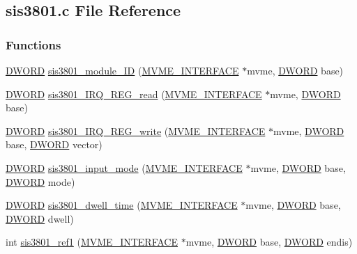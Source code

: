 \subsection{sis3801.c File Reference}
\label{sis3801_8c}
\subsubsection*{Functions}
\begin{DoxyCompactItemize}
\item 
\hyperlink{vt2_8h_a798af1e30bc65f319c1a246cecf59e39}{DWORD} \hyperlink{sis3801_8c_a751981870df7a28736f574b7679c5a7e}{sis3801\_\-module\_\-ID} (\hyperlink{structMVME__INTERFACE}{MVME\_\-INTERFACE} $\ast$mvme, \hyperlink{vt2_8h_a798af1e30bc65f319c1a246cecf59e39}{DWORD} base)
\item 
\hyperlink{vt2_8h_a798af1e30bc65f319c1a246cecf59e39}{DWORD} \hyperlink{sis3801_8c_ab2680838fe73b65e48def0018ffbe04e}{sis3801\_\-IRQ\_\-REG\_\-read} (\hyperlink{structMVME__INTERFACE}{MVME\_\-INTERFACE} $\ast$mvme, \hyperlink{vt2_8h_a798af1e30bc65f319c1a246cecf59e39}{DWORD} base)
\item 
\hyperlink{vt2_8h_a798af1e30bc65f319c1a246cecf59e39}{DWORD} \hyperlink{sis3801_8c_a6d4c4e75a50958ca3bf22363f5f63617}{sis3801\_\-IRQ\_\-REG\_\-write} (\hyperlink{structMVME__INTERFACE}{MVME\_\-INTERFACE} $\ast$mvme, \hyperlink{vt2_8h_a798af1e30bc65f319c1a246cecf59e39}{DWORD} base, \hyperlink{vt2_8h_a798af1e30bc65f319c1a246cecf59e39}{DWORD} vector)
\item 
\hyperlink{vt2_8h_a798af1e30bc65f319c1a246cecf59e39}{DWORD} \hyperlink{sis3801_8c_a80d78bb85d728329fb2f5c32bca9b258}{sis3801\_\-input\_\-mode} (\hyperlink{structMVME__INTERFACE}{MVME\_\-INTERFACE} $\ast$mvme, \hyperlink{vt2_8h_a798af1e30bc65f319c1a246cecf59e39}{DWORD} base, \hyperlink{vt2_8h_a798af1e30bc65f319c1a246cecf59e39}{DWORD} mode)
\item 
\hyperlink{vt2_8h_a798af1e30bc65f319c1a246cecf59e39}{DWORD} \hyperlink{sis3801_8c_ab88587ea5cc0122596e5e5674293ba01}{sis3801\_\-dwell\_\-time} (\hyperlink{structMVME__INTERFACE}{MVME\_\-INTERFACE} $\ast$mvme, \hyperlink{vt2_8h_a798af1e30bc65f319c1a246cecf59e39}{DWORD} base, \hyperlink{vt2_8h_a798af1e30bc65f319c1a246cecf59e39}{DWORD} dwell)
\item 
int \hyperlink{sis3801_8c_a78cc82cf4b2ad2a12f8603dba54b78fc}{sis3801\_\-ref1} (\hyperlink{structMVME__INTERFACE}{MVME\_\-INTERFACE} $\ast$mvme, \hyperlink{vt2_8h_a798af1e30bc65f319c1a246cecf59e39}{DWORD} base, \hyperlink{vt2_8h_a798af1e30bc65f319c1a246cecf59e39}{DWORD} endis)

\end{DoxyCompactItemize}

